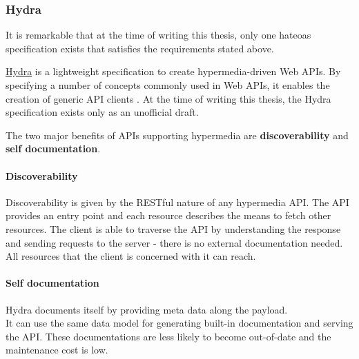 \subsubsection{Hydra}
It is remarkable that at the time of writing this thesis, only one \gls{hateoas} specification exists that satisfies the requirements stated above.

\href{http://www.hydra-cg.com/}{Hydra} is a lightweight specification to create hypermedia-driven Web APIs. By specifying a number of concepts commonly used in Web APIs, it enables the creation of generic API clients \citep{hydraspecs}. At the time of writing this thesis, the Hydra specification exists only as an unofficial draft.

The two major benefits of APIs supporting hypermedia are \textbf{discoverability} and \textbf{self documentation}.

\paragraph{Discoverability} Discoverability is given by the RESTful nature of any hypermedia API. The API provides an entry point and each resource describes the means to fetch other resources. The client is able to traverse the API by understanding the response and sending requests to the server - there is no external documentation needed. All resources that the client is concerned with it can reach.

\paragraph{Self documentation}
Hydra documents itself by providing meta data along the payload. \\
It can use the same data model for generating built-in documentation and serving the API. These documentations are less likely to become out-of-date and the maintenance cost is low.

